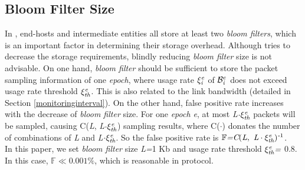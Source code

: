 \subsection{Bloom Filter Size}
In \name{}, end-hosts and intermediate entities all store at least two \emph{bloom filters}, which is an important factor in determining their storage overhead. Although \name{} tries to decrease the storage requirements, blindly reducing \emph{bloom filter} size is not advisable. On one hand, \emph{bloom filter} should be sufficient to store the packet sampling information of one \emph{epoch}, where usage rate $\xi_{\emph{i}}^\emph{e}$ of $\mathcal{B}_{\emph{i}}^e$ does not exceed usage rate threshold $\xi_{\emph{th}}^\emph{e}$. This is also related to the link bandwidth (detailed in Section \ref{monitoringinterval}).
On the other hand, false positive rate increases with the decrease of \emph{bloom filter} size. For one \emph{epoch e}, at most \emph{L}$\cdot\xi_{\emph{th}}^\emph{e}$ packets will be sampled, causing C(\emph{L}, \emph{L}$\cdot\xi_{\emph{th}}^\emph{e}$) sampling results, where C($\cdot$) donates the number of combinations of \emph{L} and \emph{L}$\cdot\xi_{\emph{th}}^\emph{e}$. So the false positive rate is $\mathbb{F}\emph{=}\emph{C}(\emph{L}, ~\emph{L}\cdot\xi_{\emph{th}}^\emph{e})^{\emph{-}1}$.\\
\indent
In this paper, we set \emph{bloom filter} size \emph{L=}1 Kb and usage rate threshold $\xi_{\emph{th}}^\emph{e} \emph{=}$ 0.8. In this case, $\mathbb{F}\ll0.001\%$, which is reasonable in \name{} protocol.
\vspace{-0.1in}
